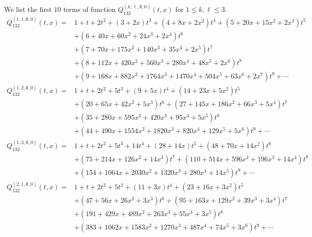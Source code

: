 \documentclass[
final,nomarks
]{dmtcs-episciences}
\newcommand{\Qmm}[1]{Q_{132}^{(#1)}(t,x)}
\begin{document}
We list the first \begin{math}10\end{math} terms of function \begin{math}\Qmm{k,\ell,\emptyset,0}\end{math} for \begin{math}1\leq k,\ell\leq 3\end{math}.
\begin{align}
\Qmm{1,1,\emptyset,0}=&1+t+2 t^2+(3+2 x) t^3+\left(4+8 x+2 x^2\right) t^4+\left(5+20 x+15 x^2+2
x^3\right) t^5\nonumber\\\nonumber
&+\left(6+40 x+60 x^2+24 x^3+2 x^4\right) t^6\\\nonumber
&+\left(7+70 x+175
x^2+140 x^3+35 x^4+2 x^5\right) t^7\\\nonumber
&+\left(8+112 x+420 x^2+560 x^3+280 x^4+48
x^5+2 x^6\right) t^8\\
&+\left(9+168 x+882 x^2+1764 x^3+1470 x^4+504 x^5+63
x^6+2 x^7\right) t^9+\cdots
\\
\Qmm{1,2,\emptyset,0}=&1+t+2 t^2+5 t^3+(9+5 x) t^4+\left(14+23 x+5 x^2\right) t^5\nonumber\\\nonumber
&+\left(20+65 x+42
x^2+5 x^3\right) t^6+\left(27+145 x+186 x^2+66 x^3+5 x^4\right)
t^7\\\nonumber
&+\left(35+280 x+595 x^2+420 x^3+95 x^4+5 x^5\right) t^8\\
&+\left(44+490
x+1554 x^2+1820 x^3+820 x^4+129 x^5+5 x^6\right) t^9+\cdots
\\
\Qmm{1,3,\emptyset,0}=&1+t+2 t^2+5 t^3+14 t^4+(28+14 x) t^5+\left(48+70 x+14 x^2\right)
t^6\nonumber\\\nonumber
&+\left(75+214 x+126 x^2+14 x^3\right) t^7+\left(110+514 x+596 x^2+196
x^3+14 x^4\right) t^8\\
&+\left(154+1064 x+2030 x^2+1320 x^3+280 x^4+14
x^5\right) t^9+\cdots
\\
\Qmm{2,1,\emptyset,0}=&1+t+2 t^2+5 t^3+(11+3 x) t^4+\left(23+16 x+3 x^2\right) t^5\nonumber\\\nonumber
&+\left(47+56 x+26
x^2+3 x^3\right) t^6+\left(95+163 x+129 x^2+39 x^3+3 x^4\right)
t^7\\\nonumber
&+\left(191+429 x+489 x^2+263 x^3+55 x^4+3 x^5\right) t^8\\
&+\left(383+1062
x+1583 x^2+1270 x^3+487 x^4+74 x^5+3 x^6\right) t^9+\cdots
\end{align}
\end{document}
